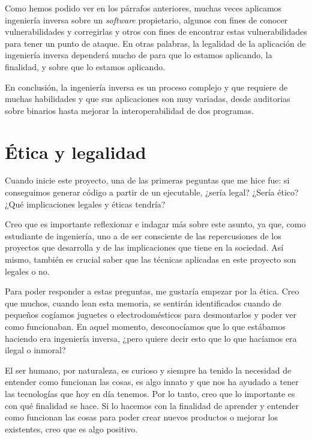 Como hemos podido ver en los párrafos anteriores, muchas veces aplicamos ingeniería inversa sobre
un \textit{software} propietario, algunos con fines de conocer vulnerabilidades y corregirlas
y otros con fines de encontrar estas vulnerabilidades para tener un punto de ataque. En
otras palabras, la legalidad de la aplicación de ingeniería inversa dependerá mucho
de para que lo estamos aplicando, la finalidad, y sobre que lo estamos aplicando.

En conclusión, la ingeniería inversa es un proceso complejo y que requiere de muchas habilidades 
y que sus aplicaciones son muy variadas, desde auditorias sobre binarios hasta mejorar
la interoperabilidad de dos programas.

\section{Ética y legalidad}
\label{sec:etica_legalidad}


Cuando inicie este proyecto, una de las primeras peguntas que me hice fue: si conseguimos
generar código a partir de un ejecutable, ¿sería legal? ¿Sería ético? ¿Qué implicaciones
legales y éticas tendría?

Creo que es importante reflexionar e indagar más sobre este asunto, ya que, como estudiante
de ingeniería, uno a de ser consciente de las repercusiones de los proyectos que desarrolla y
de las implicaciones que tiene en la sociedad. Así mismo, también es crucial saber que las
técnicas aplicadas en este proyecto son legales o no.

Para poder responder a estas preguntas, me gustaría empezar por la ética. Creo que muchos, cuando
lean esta memoria, se sentirán identificados cuando de pequeños cogíamos juguetes o electrodomésticos
para desmontarlos y poder ver como funcionaban. En aquel momento, desconocíamos que lo que estábamos
haciendo era ingeniería inversa, ¿pero quiere decir esto que lo que hacíamos era ilegal o inmoral?

El ser humano, por naturaleza, es curioso y siempre ha tenido la necesidad de entender como funcionan
las cosas, es algo innato y que nos ha ayudado a tener las tecnologías que hoy en día tenemos. Por lo tanto,
creo que lo importante es con qué finalidad se hace. Si lo hacemos con la finalidad de aprender y entender
como funcionan las cosas para poder crear nuevos productos o mejorar los existentes, creo que es algo
positivo.

